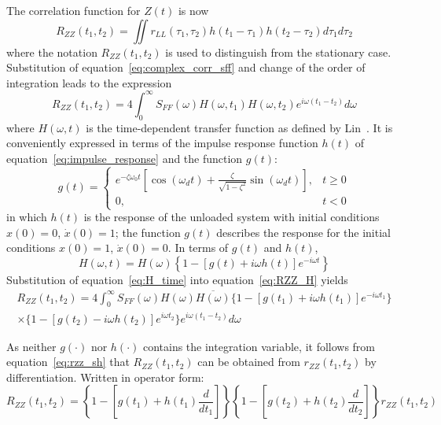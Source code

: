 \documentclass[12pt]{article}
\begin{document}
The correlation function for $Z(t)$ is now
\begin{equation}
    R_{ZZ}(t_1, t_2) = \iint r_{LL}(\tau_1, \tau_2) h(t_1 - \tau_1) h(t_2 - \tau_2) d\tau_1 d\tau_2
    \label{eq:RZZ}
\end{equation}
where the notation $R_{ZZ}(t_1, t_2)$ is used to distinguish from the stationary case. Substitution of equation~\eqref{eq:complex_corr_sff} and change of the order of integration leads to the expression
\begin{equation}
    R_{ZZ}(t_1, t_2) = 4 \int_0^{\infty} S_{FF}(\omega) H(\omega, t_1) H(\omega, t_2) e^{i\omega(t_1 - t_2)} d\omega
    \label{eq:RZZ_H}
\end{equation}
where $H(\omega, t)$ is the time-dependent transfer function as defined by Lin~\cite{lin1976}. It is conveniently expressed in terms of the impulse response function $h(t)$ of equation~\eqref{eq:impulse_response} and the function $g(t)$:
\begin{equation}
    g(t) =
    \begin{cases}
        e^{-\zeta\omega_0 t} \left[ \cos(\omega_d t) + \frac{\zeta}{\sqrt{1 - \zeta^2}} \sin(\omega_d t) \right], & t \geq 0 \\
        0, & t < 0
    \end{cases}
    \label{eq:g_function}
\end{equation}
in which $h(t)$ is the response of the unloaded system with initial conditions $x(0) = 0$, $\dot{x}(0) = 1$; the function $g(t)$ describes the response for the initial conditions $x(0) = 1$, $\dot{x}(0) = 0$. In terms of $g(t)$ and $h(t)$,
\begin{equation}
    H(\omega, t) = H(\omega) \left\{ 1 - [g(t) + i\omega h(t)] e^{-i\omega t} \right\}
    \label{eq:H_time}
\end{equation}
Substitution of equation~\eqref{eq:H_time} into equation~\eqref{eq:RZZ_H} yields
\begin{align}
    R_{ZZ}(t_1, t_2) = 4 \int_0^{\infty} S_{FF}(\omega) H(\omega) \overline{H(\omega)} \{ 1 - [g(t_1) + i\omega h(t_1)] e^{-i\omega t_1} \} \nonumber \\
    \times \{ 1 - [g(t_2) - i\omega h(t_2)] e^{i\omega t_2} \} e^{i\omega(t_1 - t_2)} d\omega
    \label{eq:RZZ_full}
\end{align}

As neither $g(\cdot)$ nor $h(\cdot)$ contains the integration variable, it follows from equation~\eqref{eq:rzz_sh} that $R_{ZZ}(t_1, t_2)$ can be obtained from $r_{ZZ}(t_1, t_2)$ by differentiation. Written in operator form:
\begin{equation}
    R_{ZZ}(t_1, t_2) = \left\{ 1 - [g(t_1) + h(t_1) \frac{d}{dt_1}] \right\} \left\{ 1 - [g(t_2) + h(t_2) \frac{d}{dt_2}] \right\} r_{ZZ}(t_1, t_2)
    \label{eq:RZZ_operator}
\end{equation}
\end{document}
